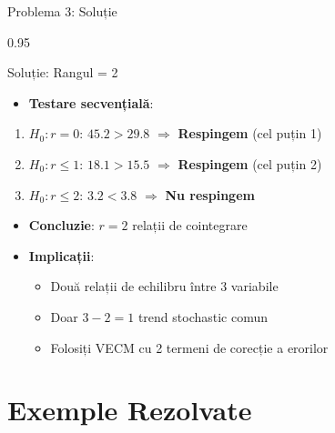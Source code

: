 \documentclass[9pt, aspectratio=169, t]{beamer}
\begin{document}
\begin{frame}{Problema 3: Soluție}
    \begin{cminipage}{0.95\textwidth}
    \begin{exampleblock}{Soluție: Rangul = 2}
        \begin{itemize}\setlength{\itemsep}{0pt}
            \item \textbf{Testare secvențială}:
        \end{itemize}
        \begin{enumerate}\setlength{\itemsep}{0pt}
            \item $H_0: r = 0$: $45.2 > 29.8$ $\Rightarrow$ \textbf{Respingem} (cel puțin 1)
            \item $H_0: r \leq 1$: $18.1 > 15.5$ $\Rightarrow$ \textbf{Respingem} (cel puțin 2)
            \item $H_0: r \leq 2$: $3.2 < 3.8$ $\Rightarrow$ \textbf{Nu respingem}
        \end{enumerate}

        \begin{itemize}\setlength{\itemsep}{0pt}
            \item \textbf{Concluzie}: $r = 2$ relații de cointegrare
            \item \textbf{Implicații}:
            \begin{itemize}\setlength{\itemsep}{0pt}
                \item Două relații de echilibru între 3 variabile
                \item Doar $3 - 2 = 1$ trend stochastic comun
                \item Folosiți VECM cu 2 termeni de corecție a erorilor
            \end{itemize}
        \end{itemize}
    \end{exampleblock}
    \end{cminipage}
\end{frame}

\section{Exemple Rezolvate}
\end{document}
